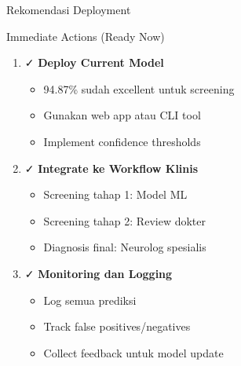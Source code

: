 \documentclass[aspectratio=169]{beamer}
\begin{document}
\begin{frame}{Rekomendasi Deployment}
\begin{block}{Immediate Actions (Ready Now)}
\begin{enumerate}
    \item ✓ \textbf{Deploy Current Model}
    \begin{itemize}
        \item 94.87\% sudah excellent untuk screening
        \item Gunakan web app atau CLI tool
        \item Implement confidence thresholds
    \end{itemize}
    
    \item ✓ \textbf{Integrate ke Workflow Klinis}
    \begin{itemize}
        \item Screening tahap 1: Model ML
        \item Screening tahap 2: Review dokter
        \item Diagnosis final: Neurolog spesialis
    \end{itemize}
    
    \item ✓ \textbf{Monitoring dan Logging}
    \begin{itemize}
        \item Log semua prediksi
        \item Track false positives/negatives
        \item Collect feedback untuk model update
    \end{itemize}
\end{enumerate}
\end{block}
\end{frame}
\end{document}
